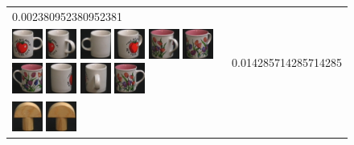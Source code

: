 \begin{figure}[tbp]
\begin{center}
\begin{tabular}{m{11cm} | m{3cm} |}
{0.002380952380952381} \\ \includegraphics[width=1cm]{coil/beeld-36.eps} 
\includegraphics[width=1cm]{coil/beeld-40.eps} 
\includegraphics[width=1cm]{coil/beeld-37.eps} 
\includegraphics[width=1cm]{coil/beeld-39.eps} 
\includegraphics[width=1cm]{coil/beeld-10.eps} 
\includegraphics[width=1cm]{coil/beeld-9.eps} 
\includegraphics[width=1cm]{coil/beeld-7.eps} 
\includegraphics[width=1cm]{coil/beeld-38.eps} 
\includegraphics[width=1cm]{coil/beeld-41.eps} 
\includegraphics[width=1cm]{coil/beeld-6.eps} & {\scriptsize 
0.014285714285714285} \\ \includegraphics[width=1cm]{coil/beeld-0.eps} 
\includegraphics[width=1cm]{coil/beeld-1.eps} 

\end{tabular}
\end{center}
\end{figure}
